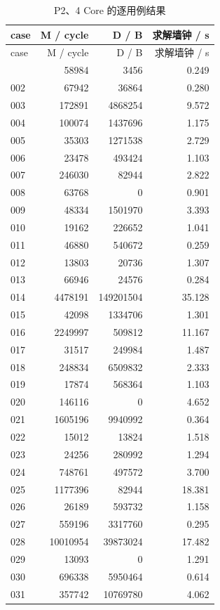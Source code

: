 \documentclass[anonymous,notoc]{gmcm2026}
\begin{document}
\begin{longtable}{lrrr}
\caption{P2、4 Core 的逐用例结果}\\
\toprule
case & M / cycle & D / B & 求解墙钟 / s\\\midrule
\endfirsthead
\toprule
case & M / cycle & D / B & 求解墙钟 / s\\\midrule
\endhead
\bottomrule\endfoot
001 & 58984 & 3456 & 0.249 \\
002 & 67942 & 36864 & 0.280 \\
003 & 172891 & 4868254 & 9.572 \\
004 & 100074 & 1437696 & 1.175 \\
005 & 35303 & 1271538 & 2.729 \\
006 & 23478 & 493424 & 1.103 \\
007 & 246030 & 82944 & 2.822 \\
008 & 63768 & 0 & 0.901 \\
009 & 48334 & 1501970 & 3.393 \\
010 & 19162 & 226652 & 1.041 \\
011 & 46880 & 540672 & 0.259 \\
012 & 13803 & 20736 & 1.307 \\
013 & 66946 & 24576 & 0.284 \\
014 & 4478191 & 149201504 & 35.128 \\
015 & 42098 & 1334706 & 1.301 \\
016 & 2249997 & 509812 & 11.167 \\
017 & 31517 & 249984 & 1.487 \\
018 & 248834 & 6509832 & 2.333 \\
019 & 17874 & 568364 & 1.103 \\
020 & 146116 & 0 & 4.652 \\
021 & 1605196 & 9940992 & 0.364 \\
022 & 15012 & 13824 & 1.518 \\
023 & 24256 & 280992 & 1.294 \\
024 & 748761 & 497572 & 3.700 \\
025 & 1177396 & 82944 & 18.381 \\
026 & 26189 & 593732 & 1.158 \\
027 & 559196 & 3317760 & 0.295 \\
028 & 10010954 & 39873024 & 17.482 \\
029 & 13093 & 0 & 1.291 \\
030 & 696338 & 5950464 & 0.614 \\
031 & 357742 & 10769780 & 4.062 \\

\end{longtable}
\end{document}
